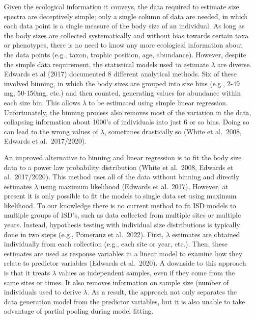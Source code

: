 \documentclass[
  12pt,
]{article}
\begin{document}
Given the ecological information it conveys, the data required to
estimate size spectra are deceptively simple; only a single column of
data are needed, in which each data point is a single measure of the
body size of an individual. As long as the body sizes are collected
systematically and without bias towards certain taxa or phenotypes,
there is no need to know any more ecological information about the data
points (e.g., taxon, trophic position, age, abundance). However, despite
the simple data requirement, the statistical models used to estimate
\(\lambda\) are diverse. Edwards et al (2017) documented 8 different
analytical methods. Six of these involved binning, in which the body
sizes are grouped into size bins (e.g., 2-49 mg, 50-150mg, etc.) and
then counted, generating values for abundance within each size bin. This
allows \(\lambda\) to be estimated using simple linear regression.
Unfortunately, the binning process also removes most of the variation in
the data, collapsing information about 1000's of individuals into just 6
or so bins. Doing so can lead to the wrong values of \(\lambda\),
sometimes drastically so (White et al.~2008, Edwards et al.~2017/2020).

An improved alternative to binning and linear regression is to fit the
body size data to a power law probability distribution (White et
al.~2008, Edwards et al.~2017/2020). This method uses all of the data
without binning and directly estimates \(\lambda\) using maximum
likelihood (Edwards et al.~2017)\emph{.} However, at present it is only
possible to fit the models to single data set using maximum likelihood.
To our knowledge there is no current method to fit ISD models to
multiple groups of ISD's, such as data collected from multiple sites or
multiple years. Instead, hypothesis testing with individual size
distributions is typically done in two steps (e.g., Pomeranz et
al.~2022). First, \(\lambda\) estimates are obtained individually from
each collection (e.g., each site or year, etc.). Then, these estimates
are used as response variables in a linear model to examine how they
relate to predictor variables (Edwards et al.~2020). A downside to this
approach is that it treats \(\lambda\) values as independent samples,
even if they come from the same sites or times. It also removes
information on sample size (number of individuals used to derive
\(\lambda\). As a result, the approach not only separates the data
generation model from the predictor variables, but it is also unable to
take advantage of partial pooling during model fitting.
\end{document}

